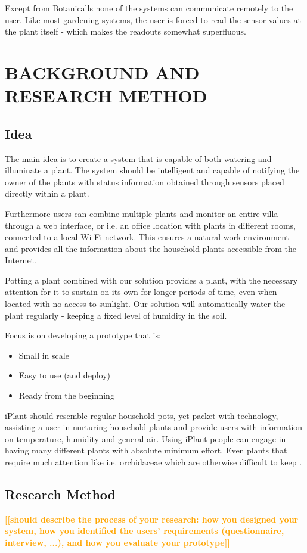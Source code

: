 \documentclass{ubicomp2012}
\newcommand{\todo}[1]{\textsf{\textbf{\textcolor{Orange}{[[#1]]}}}}
\begin{document}
Except from Botanicalls none of the systems can communicate remotely to the user. Like most gardening systems, the user is forced to read the sensor values at the plant itself - which makes the readouts somewhat superfluous.

\section{BACKGROUND AND RESEARCH METHOD}

\subsection{Idea}
The main idea is to create a system that is capable of both watering and illuminate a plant. The system should be intelligent and capable of notifying the owner of the plants with status information obtained through sensors placed directly within a plant.

Furthermore users can combine multiple plants and monitor an entire villa through a web interface, or i.e. an office location with plants in different rooms, connected to a local Wi-Fi network. This ensures a natural work environment and provides all the information about the household plants accessible from the Internet.

Potting a plant combined with our solution provides a plant, with the necessary attention for it to sustain on its own for longer periods of time, even when located with no access to sunlight. Our solution will automatically water the plant regularly - keeping a fixed level of humidity in the soil.

Focus is on developing a prototype that is:
\begin{itemize}
    \item Small in scale
    \item Easy to use (and deploy)
    \item Ready from the beginning
\end{itemize}

iPlant should resemble regular household pots, yet packet with technology, assisting a user in nurturing household plants and provide users with information on temperature, humidity and general air. Using iPlant people can engage in having many different plants with absolute minimum effort. Even plants that require much attention like i.e. orchidaceae which are otherwise difficult to keep \cite{naturstyrelsen}.

\subsection{Research Method}
\todo{should describe the process of your research: how you designed your system, how you identified the users’ requirements (questionnaire, interview, ...), and how you evaluate your prototype}
\end{document}
